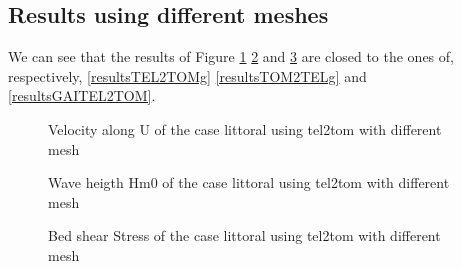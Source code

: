 \subsection{Results using different meshes}
We can see that the results of Figure \ref{resultsTEL2TOMdiffg}
\ref{resultsTOM2TELdiffg} and \ref{resultsGAITEL2TOMdiff} are closed to the
ones of, respectively, \ref{resultsTEL2TOMg} \ref{resultsTOM2TELg} and
\ref{resultsGAITEL2TOM}.

\begin{figure} [!h]
\centering
{}
\caption{Velocity along U of the case littoral using tel2tom with different
  mesh}
\label{resultsTEL2TOMdiffg}
\end{figure}
\begin{figure} [!h]
\centering
{}
\caption{Wave heigth Hm0 of the case littoral using tel2tom with different
  mesh}
\label{resultsTOM2TELdiffg}
\end{figure}
\begin{figure} [!h]
\centering
{}
\caption{Bed shear Stress of the case littoral using tel2tom with different
  mesh}
\label{resultsGAITEL2TOMdiff}
\end{figure}



